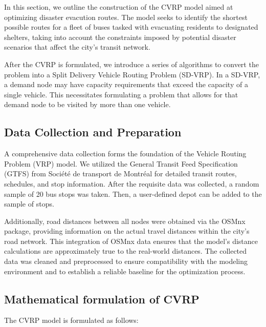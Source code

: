 \documentclass[12pt]{article}
\begin{document}
In this section, we outline the construction of the CVRP model aimed at optimizing disaster evacution routes.
The model seeks to identify the shortest possible routes for a fleet of buses tasked with evacuating residents to designated shelters, taking into account the constraints imposed by potential disaster scenarios that affect the city's transit network.

After the CVRP is formulated, we introduce a series of algorithms to convert the problem into a Split Delivery Vehicle Routing Problem (SD-VRP).
In a SD-VRP, a demand node may have capacity requirements that exceed the capacity of a single vehicle.
This necessitates formulating a problem that allows for that demand node to be visited by more than one vehicle.


\subsection{Data Collection and Preparation}

A comprehensive data collection forms the foundation of the Vehicle Routing Problem (VRP) model.
We utilized the General Transit Feed Specification (GTFS) from Société de transport de Montréal for detailed transit routes, schedules, and stop information.
After the requisite data was collected, a random sample of 20 bus stops was taken. Then, a user-defined depot can be added to the sample of stops.

Additionally, road distances between all nodes were obtained via the OSMnx package, providing information on the actual travel distances within the city's road network.
This integration of OSMnx data ensures that the model's distance calculations are approximately true to the real-world distances.
The collected data was cleaned and preprocessed to ensure compatibility with the modeling environment and to establish a reliable baseline for the optimization process.

\subsection{Mathematical formulation of CVRP}

The CVRP model is formulated as follows:
\end{document}
